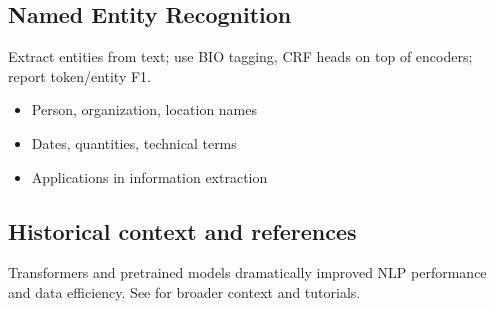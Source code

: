 \subsection{Named Entity Recognition}

Extract entities from text; use BIO tagging, CRF heads on top of encoders; report token/entity F1.
\begin{itemize}
    \item Person, organization, location names
    \item Dates, quantities, technical terms
    \item Applications in information extraction
\end{itemize}

\subsection{Historical context and references}

Transformers \textcite{Vaswani2017} and pretrained models \textcite{Devlin2018,Radford2019} dramatically improved NLP performance and data efficiency. See \textcite{GoodfellowEtAl2016,Prince2023,D2LChapterAttention} for broader context and tutorials.

